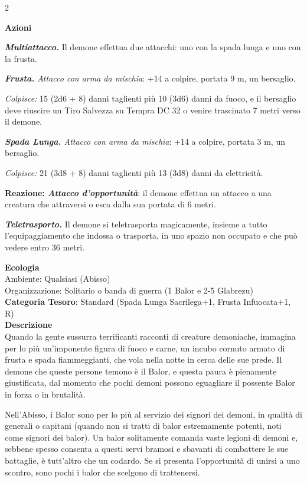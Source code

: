 \begin{multicols}{2}
{\textbf{Azioni}

\emph{\textbf{Multiattacco.}} Il demone effettua due attacchi: uno con la spada lunga e uno con la frusta.

\emph{\textbf{Frusta.} Attacco con arma da mischia}: +14 a colpire, portata 9 m, un bersaglio.

\emph{Colpisce:} 15 (2d6 + 8) danni taglienti più 10 (3d6) danni da fuoco, e il bersaglio deve riuscire un Tiro Salvezza su Tempra DC 32 o venire trascinato 7 metri verso il demone.

\emph{\textbf{Spada Lunga.} Attacco con arma da mischia}: +14 a colpire, portata 3 m, un bersaglio.

\emph{Colpisce:} 21 (3d8 + 8) danni taglienti più 13 (3d8) danni da elettricità.

\textbf{Reazione: \emph{Attacco d'opportunità}}: il demone effettua un attacco a una creatura che attraversi o esca dalla sua portata di 6 metri.

\emph{\textbf{Teletrasporto.}} Il demone si teletrasporta magicamente, insieme a tutto l'equipaggiamento che indossa o trasporta, in uno spazio non occupato e che può vedere entro 36 metri.

\textbf{Ecologia}\\
Ambiente: Qualsiasi (Abisso)\\
Organizzazione: Solitario o banda di guerra (1 Balor e 2-5 Glabrezu)\\
\textbf{Categoria Tesoro}: Standard (Spada Lunga Sacrilega+1, Frusta Infuocata+1, R)\\
\textbf{Descrizione}\\
Quando la gente sussurra terrificanti racconti di creature demoniache, immagina per lo più un'imponente figura di fuoco e carne, un incubo cornuto armato di frusta e spada fiammeggianti, che vola nella notte in cerca delle sue prede. Il demone che queste persone temono è il Balor, e questa paura è pienamente giustificata, dal momento che pochi demoni possono eguagliare il possente Balor in forza o in brutalità.

Nell'Abisso, i Balor sono per lo più al servizio dei signori dei demoni, in qualità di generali o capitani (quando non si tratti di balor estremamente potenti, noti come signori dei balor). Un balor solitamente comanda vaste legioni di demoni e, sebbene spesso consenta a questi servi bramosi e sbavanti di combattere le sue battaglie, è tutt'altro che un codardo. Se si presenta l'opportunità di unirsi a uno scontro, sono pochi i balor che scelgono di trattenersi.

}
\end{multicols}
